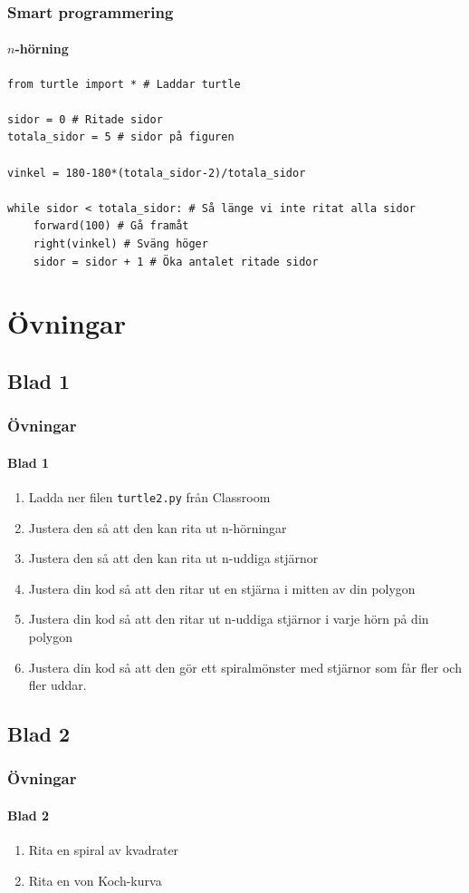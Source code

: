 \documentclass[aspectratio=169]{beamer}
\begin{document}
\begin{frame}[fragile]
	\frametitle{Smart programmering}
	\framesubtitle{\(n\)-hörning}
	
	\begin{lstlisting}
from turtle import * # Laddar turtle

sidor = 0 # Ritade sidor
totala_sidor = 5 # sidor på figuren

vinkel = 180-180*(totala_sidor-2)/totala_sidor

while sidor < totala_sidor: # Så länge vi inte ritat alla sidor
    forward(100) # Gå framåt
    right(vinkel) # Sväng höger
    sidor = sidor + 1 # Öka antalet ritade sidor
	\end{lstlisting}
	
\end{frame}

\section{Övningar}

\subsection{Blad 1}

\begin{frame}
	\frametitle{Övningar}
	\framesubtitle{Blad 1}
	
	\begin{enumerate}
		\item Ladda ner filen \texttt{turtle2.py} från Classroom
		\item Justera den så att den kan rita ut n-hörningar
		\item Justera den så att den kan rita ut n-uddiga stjärnor
		\item Justera din kod så att den ritar ut en stjärna i mitten av din polygon
		\item Justera din kod så att den ritar ut n-uddiga stjärnor i varje hörn på din polygon
		\item Justera din kod så att den gör ett spiralmönster med stjärnor som får fler och fler uddar.
	\end{enumerate}

\end{frame}

\subsection{Blad 2}

\begin{frame}
	\frametitle{Övningar}
	\framesubtitle{Blad 2}
	
	\begin{enumerate}
		\item Rita en spiral av kvadrater
		\item Rita en von Koch-kurva
	\end{enumerate}

\end{frame}
\end{document}
